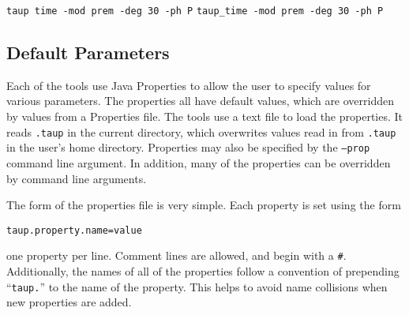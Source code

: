 \texttt{taup time -mod prem -deg 30 -ph P}
\texttt{taup\_time -mod prem -deg 30 -ph P}

\subsection{Default Parameters} \label{properties}

Each of the tools use Java Properties to allow the user to specify values
for various
parameters. The properties all have default values, which are overridden by
values from a Properties file. The tools use a text file to load the properties. It reads  \texttt{.taup} in the
current directory, which overwrites values read in from
\texttt{.taup} in the user's home directory. Properties may also be specified by
the \texttt{--prop} command line argument.
In addition, many of the properties can be overridden by command line arguments.

The form of the properties file is very simple. Each property is set using
the form
\begin{verbatim}
taup.property.name=value
\end{verbatim}
 one property per line.
Comment lines are allowed, and begin with a \texttt{\#}.
Additionally, the names of all of the properties follow a convention of
prepending ``\texttt{taup.}'' to the name of the property.
This helps to avoid name collisions when new properties
are added.

